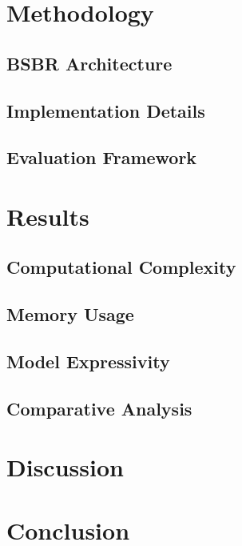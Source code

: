 \documentclass[12pt]{article}
\begin{document}
\section{Methodology}
\label{sec:methodology}

\subsection{BSBR Architecture}
\subsection{Implementation Details}
\subsection{Evaluation Framework}

\section{Results}
\label{sec:results}

\subsection{Computational Complexity}
\subsection{Memory Usage}
\subsection{Model Expressivity}
\subsection{Comparative Analysis}

\section{Discussion}
\label{sec:discussion}

\section{Conclusion}
\label{sec:conclusion}

\printbibliography
\end{document}
